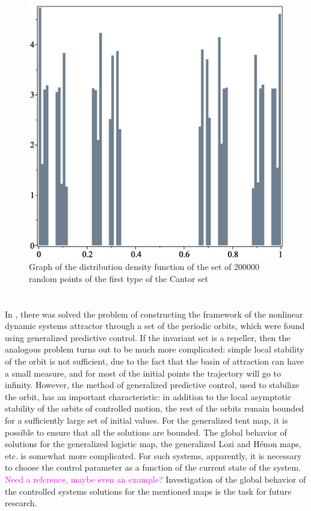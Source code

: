 \documentclass[12pt,a4paper]{amsart}
\begin{document}
\begin{figure}[h!]
\centering
\includegraphics[scale=0.28]{Fig16}
\caption{Graph of the distribution density function of the set of 200000 random points of the first type of the Cantor set} \label{f16}
\end{figure}

\section{}

In \cite{DSI}, there was solved the problem of constructing the framework of the nonlinear dynamic systems attractor through a set of the periodic orbits, which were 
found using generalized predictive control. If the invariant set is a repeller, then the analogous problem turns out to be much more complicated: simple local stability 
of the orbit is not sufficient, due to the fact that the basin of attraction can have a small measure, and for most of the initial points the trajectory will go to infinity. 
However, the method of generalized predictive control, used to stabilize the orbit, has an important characteristic: in addition to the local asymptotic stability 
of the orbits of controlled motion, the rest of the orbits remain bounded for a sufficiently large set of initial values. For the generalized tent map, it is possible to ensure 
that all the solutions are bounded. The global behavior of solutions for the generalized logistic map, the generalized Lozi and Hénon maps, etc. is somewhat more complicated. 
For such systems, apparently, it is necessary to choose the control parameter as a function of the current state of the system. 
\textcolor{magenta}{Need a reference, maybe even an example?}
Investigation of the global behavior of 
the controlled systems solutions for the mentioned maps is the task for future research.




\end{document}
